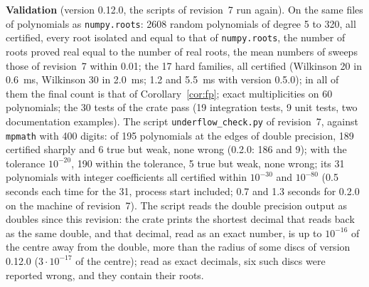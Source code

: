 \documentclass[10pt,a4paper]{article}
\theoremstyle{definition}
\numberwithin{equation}{section}
\begin{document}
\textbf{Validation} (version 0.12.0, the scripts of revision~7 run again). On the same files of
polynomials as \texttt{numpy.roots}: 2608 random polynomials of degree 5 to 320, all certified, every
root isolated and equal to that of \texttt{numpy.roots}, the number of roots proved real equal to the
number of real roots, the mean numbers of sweeps those of revision~7 within 0.01; the 17 hard families,
all certified (Wilkinson 20 in 0.6~ms, Wilkinson 30 in 2.0~ms; 1.2 and 5.5~ms with version 0.5.0); in
all of them the final count is that of Corollary~\ref{cor:fp}; exact multiplicities on 60 polynomials;
the 30 tests of the crate pass (19 integration tests, 9 unit tests, two documentation examples). The script \texttt{underflow\_check.py} of revision~7, against \texttt{mpmath} with 400 digits: of
195 polynomials at the edges of double precision, 189 certified sharply and 6 true but weak, none wrong
(0.2.0: 186 and 9); with the tolerance $10^{-20}$, 190 within the tolerance, 5 true but weak, none
wrong; its 31 polynomials with integer coefficients all certified within $10^{-30}$ and $10^{-80}$
(0.5 seconds each time for the 31, process start included; 0.7 and 1.3 seconds for 0.2.0 on the
machine of revision~7). The script reads the double precision output as doubles since this revision:
the crate prints the shortest decimal that reads back as the same double, and that decimal, read as an
exact number, is up to $10^{-16}$ of the centre away from the double, more than the radius of some discs
of version 0.12.0 ($3\cdot10^{-17}$ of the centre); read as exact decimals, six such discs were reported
wrong, and they contain their roots.
\end{document}
